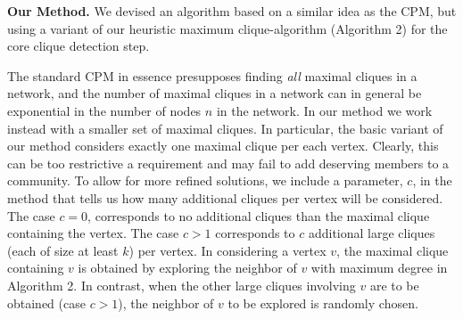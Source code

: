 {\bf Our Method. } We devised an algorithm based on a similar idea as the CPM,
but using a variant of our heuristic maximum clique-algorithm 
(Algorithm 2) for the core clique detection step. 

The standard CPM in essence presupposes finding {\em all} maximal cliques in a network, and the number of maximal cliques in a network can in general be exponential in the number of nodes $n$ in the network. In our method we work instead with a smaller set of maximal cliques. In particular, the basic variant of our method considers exactly one maximal clique per each vertex. Clearly, this can be too restrictive a requirement and may fail to add deserving members to a community. To allow for more refined solutions, we include a parameter, $c$, 
in the method that tells us how many additional cliques per vertex will be considered.
The case $c=0$, corresponds to no additional cliques than the maximal clique containing the vertex. The case $c>1$ corresponds to $c$ additional large cliques (each of size at least $k$)
per vertex.  In considering a vertex $v$, the maximal clique containing $v$ 
is obtained by exploring the neighbor of $v$ with maximum degree in Algorithm 2.
In contrast, when the other large cliques involving $v$ are to be obtained (case $c>1$),
the neighbor of $v$ to be explored is randomly chosen.      





